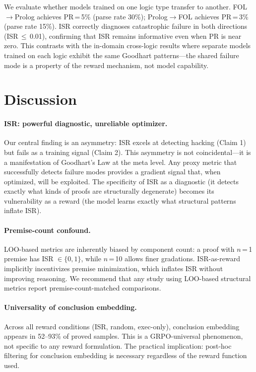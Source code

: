 \documentclass[11pt,a4paper]{article}
\begin{document}
We evaluate whether models trained on one logic type transfer to another.
FOL$\rightarrow$Prolog achieves PR\,=\,5\% (parse rate 30\%); Prolog$\rightarrow$FOL achieves PR\,=\,3\% (parse rate 15\%).
ISR correctly diagnoses catastrophic failure in both directions (ISR\,$\leq$\,0.01), confirming that ISR remains informative even when PR is near zero.
This contrasts with the in-domain cross-logic results where separate models trained on each logic exhibit the same Goodhart patterns---the shared failure mode is a property of the reward mechanism, not model capability.

\section{Discussion}
\label{sec:discussion}

\paragraph{ISR: powerful diagnostic, unreliable optimizer.}
Our central finding is an asymmetry: ISR excels at detecting hacking (Claim 1) but fails as a training signal (Claim 2).
This asymmetry is not coincidental---it is a manifestation of Goodhart's Law at the meta level.
Any proxy metric that successfully detects failure modes provides a gradient signal that, when optimized, will be exploited.
The specificity of ISR as a diagnostic (it detects exactly what kinds of proofs are structurally degenerate) becomes its vulnerability as a reward (the model learns exactly what structural patterns inflate ISR).

\paragraph{Premise-count confound.}
LOO-based metrics are inherently biased by component count: a proof with $n$\,=\,1 premise has ISR $\in \{0, 1\}$, while $n$\,=\,10 allows finer gradations.
ISR-as-reward implicitly incentivizes premise minimization, which inflates ISR without improving reasoning.
We recommend that any study using LOO-based structural metrics report premise-count-matched comparisons.

\paragraph{Universality of conclusion embedding.}
Across all reward conditions (ISR, random, exec-only), conclusion embedding appears in 52--93\% of proved samples.
This is a GRPO-universal phenomenon, not specific to any reward formulation.
The practical implication: post-hoc filtering for conclusion embedding is necessary regardless of the reward function used.
\end{document}
